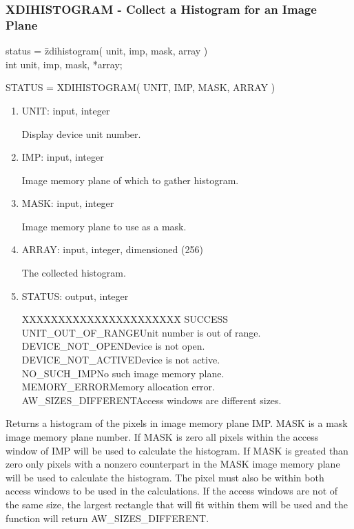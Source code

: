 \subsubsection{XDIHISTOGRAM - Collect a Histogram for an Image Plane}
\begin{tabbing}
status = \=zdihistogram( unit, imp, mask, array )\\
\>int  unit, imp, mask, *array;\\
\end{tabbing}
STATUS = XDIHISTOGRAM( UNIT, IMP, MASK, ARRAY )
\begin{enumerate}
\item UNIT:  input, integer

Display device unit number.
\item IMP:  input, integer

Image memory plane of which to gather histogram.
\item MASK:  input, integer

Image memory plane to use as a mask.
\item ARRAY:  input, integer, dimensioned (256)

The collected histogram.
\item STATUS:  output, integer
\begin{tabbing}
XXXXXXXXXXXXXXXXXXXXXX\=\kill
SUCCESS\\
UNIT\_OUT\_OF\_RANGE\>Unit number is out of range.\\
DEVICE\_NOT\_OPEN\>Device is not open.\\
DEVICE\_NOT\_ACTIVE\>Device is not active.\\
NO\_SUCH\_IMP\>No such image memory plane.\\
MEMORY\_ERROR\>Memory allocation error.\\
AW\_SIZES\_DIFFERENT\>Access windows are different sizes.\\
\end{tabbing}
\end{enumerate}
Returns a histogram of the pixels in image memory plane IMP.  MASK is
a mask image memory plane number.  If MASK is zero all pixels within
the access window of IMP will be used to calculate the histogram.  If
MASK is greated than zero only pixels with a nonzero counterpart in
the MASK image memory plane will be used to calculate the histogram.
The pixel must also be within both access windows to be used in the
calculations.  If the access windows are not of the same size, the
largest rectangle that will fit within them will be used and the
function will return AW\_SIZES\_DIFFERENT.
\newpage
